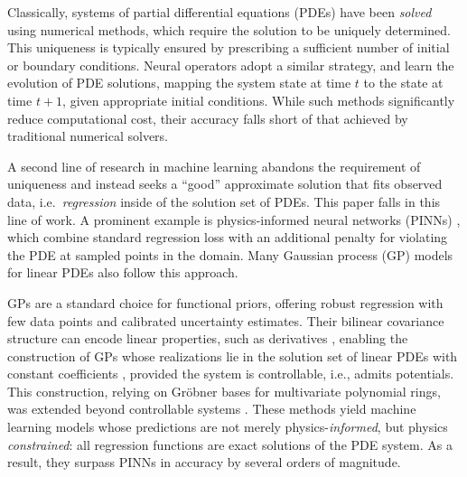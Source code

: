\documentclass{article} %
\theoremstyle{plain}
\theoremstyle{definition}
\theoremstyle{remark}
\begin{document}




 


Classically, systems of partial differential equations (PDEs) have been \emph{solved} using numerical methods, which require the solution to be uniquely determined. This uniqueness is typically ensured by prescribing a sufficient number of initial or boundary conditions. Neural operators adopt a similar strategy, and learn the evolution of PDE solutions, mapping the system state at time $t$ to the state at time $t+1$, given appropriate initial conditions. While such methods significantly reduce computational cost, their accuracy falls short of that achieved by traditional numerical solvers.

A second line of research in machine learning abandons the requirement of uniqueness and instead seeks a ``good'' approximate solution that fits observed data, i.e.\ \emph{regression} inside of the solution set of PDEs. This paper falls in this line of work. A prominent example is physics-informed neural networks (PINNs) \citep{raissi2019physics}, which combine standard regression loss with an additional penalty for violating the PDE at sampled points in the domain. Many Gaussian process (GP) models for linear PDEs also follow this approach.

GPs \citep{RW} are a standard choice for functional priors, offering robust regression with few data points and calibrated uncertainty estimates. Their bilinear covariance structure can encode linear properties, such as derivatives \citep{swain2016inferring,harrington2016differential}, enabling the construction of GPs whose realizations lie in the solution set of linear PDEs with constant coefficients \citep{LH_AlgorithmicLinearlyConstrainedGaussianProcesses,LinearlyConstrainedGP,MacedoCastro2008,scheuerer2012covariance,Wahlstrom13modelingmagnetic,MagneticFieldGP,jidling2018probabilistic,sarkka2011linear}, provided the system is controllable, i.e., admits potentials. This construction, relying on Gröbner bases for multivariate polynomial rings, was extended beyond controllable systems \citep{harkonen2023gaussian}. These methods yield machine learning models whose predictions are not merely physics-\emph{informed}, but physics \emph{constrained}: all regression functions are exact solutions of the PDE system. As a result, they surpass PINNs in accuracy by several orders of magnitude.
\end{document}
